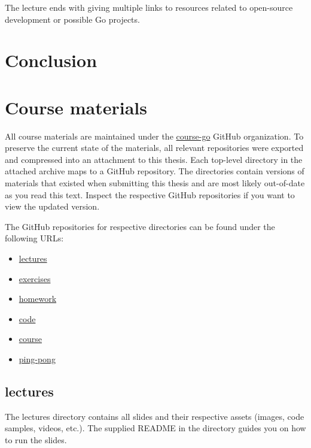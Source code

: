 \documentclass[
  digital,
  color,
  oneside,
  nosansbold,
  nocolorbold,
  lof,
  lot,
]{fithesis4}
\begin{document}
The lecture ends with giving multiple links to resources related to open-source development or possible Go projects.

\chapter{Conclusion}

\printbibliography[heading=bibintoc]

\appendix
\chapter{Course materials}

All course materials are maintained under the \href{https://github.com/course-go}{course-go} GitHub organization. To preserve the current state of the materials, all relevant repositories were exported and compressed into an attachment to this thesis. Each top-level directory in the attached archive maps to a GitHub repository. The directories contain versions of materials that existed when submitting this thesis and are most likely out-of-date as you read this text. Inspect the respective GitHub repositories if you want to view the updated version.

The GitHub repositories for respective directories can be found under the following URLs:
\begin{itemize}
    \item \href{https://github.com/course-go/lectures}{lectures}
    \item \href{https://github.com/course-go/exercises}{exercises}
    \item \href{https://github.com/course-go/homework}{homework}
    \item \href{https://github.com/course-go/code}{code}
    \item \href{https://github.com/course-go/course}{course}
    \item \href{https://github.com/course-go/ping-pong}{ping-pong}
\end{itemize}

\section{lectures}

The lectures directory contains all slides and their respective assets (images, code samples, videos, etc.). The supplied README in the directory guides you on how to run the slides.
\end{document}
